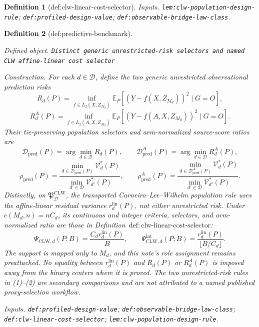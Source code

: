 \documentclass{article}
\newtheorem{definition}{Definition}
\begin{document}
\begin{definition}[def:clw-linear-cost-selector]
\par\smallskip\noindent\emph{Inputs.} \texttt{lem:\allowbreak{}clw-\allowbreak{}population-\allowbreak{}design-\allowbreak{}rule}; \texttt{def:\allowbreak{}profiled-\allowbreak{}design-\allowbreak{}value}; \texttt{def:\allowbreak{}observable-\allowbreak{}bridge-\allowbreak{}law-\allowbreak{}class}.
\end{definition}

\begin{definition}[def:predictive-benchmark]\label{def:predictive-benchmark}
\par\smallskip\noindent\emph{Defined object.} \texttt{Distinct generic unrestricted-\allowbreak{}risk selectors and named CLW affine-\allowbreak{}linear cost selector}
\par\smallskip\noindent\emph{Construction.} For each \(d\in\mathcal D\), define the two generic unrestricted observational prediction risks
\[
 R_d(P)=\inf_{f\in L_2(X,Z_{M_d})}
 \mathbb E_P[(Y-f(X,Z_{M_d}))^2\mid G=O],
\]
\[
 R_d^A(P)=\inf_{f\in L_2(A,X,Z_{M_d})}
 \mathbb E_P[(Y-f(A,X,Z_{M_d}))^2\mid G=O].                \tag{1}
\]
Their tie-preserving population selectors and arm-normalized source-score ratios are
\[
 \mathcal D_{\mathrm{pred}}(P)=\arg\min_{d\in\mathcal D}R_d(P),
 \qquad
 \mathcal D_{\mathrm{pred}}^A(P)=\arg\min_{d\in\mathcal D}R_d^A(P),
\]
\[
 \rho_{\mathrm{pred}}(P)=
 \frac{\min_{d\in\mathcal D_{\mathrm{pred}}(P)}\mathcal V_d^*(P)}
 {\min_{d'\in\mathcal D}\mathcal V_{d'}^*(P)},
 \qquad
 \rho_{\mathrm{pred}}^A(P)=
 \frac{\min_{d\in\mathcal D_{\mathrm{pred}}^A(P)}\mathcal V_d^*(P)}
 {\min_{d'\in\mathcal D}\mathcal V_{d'}^*(P)}.           \tag{2}
\]
Distinctly, on \(\mathfrak P_{\mathcal D}^{\mathrm{CLW}}\), the transported Carneiro--Lee--Wilhelm population rule uses the affine-linear residual variance \(r_d^{\mathrm{lin}}(P)\), not either unrestricted risk.  Under \(c(M_d,n)=nC_d\), its continuous and integer criteria, selectors, and arm-normalized ratio are those in Definition~\(\mathrm{def{:}clw\text{-}linear\text{-}cost\text{-}selector}\):
\[
 \Psi_{\mathrm{CLW},d}(P;B)=\frac{C_dr_d^{\mathrm{lin}}(P)}{B},
 \qquad
 \Psi_{\mathrm{CLW},d}^{\mathrm{int}}(P;B)
 =\frac{r_d^{\mathrm{lin}}(P)}{\lfloor B/C_d\rfloor}.      \tag{3}
\]
The support is mapped only to \(M_d\), and this note's role assignment remains preattached.  No equality between \(r_d^{\mathrm{lin}}(P)\) and \(R_d(P)\) or \(R_d^A(P)\) is imposed away from the binary centers where it is proved.  The two unrestricted-risk rules in (1)--(2) are secondary comparisons and are not attributed to a named published proxy-selection workflow.
\par\smallskip\noindent\emph{Inputs.} \texttt{def:\allowbreak{}profiled-\allowbreak{}design-\allowbreak{}value}; \texttt{def:\allowbreak{}observable-\allowbreak{}bridge-\allowbreak{}law-\allowbreak{}class}; \texttt{def:\allowbreak{}clw-\allowbreak{}linear-\allowbreak{}cost-\allowbreak{}selector}; \texttt{lem:\allowbreak{}clw-\allowbreak{}population-\allowbreak{}design-\allowbreak{}rule}.
\end{definition}
\end{document}
